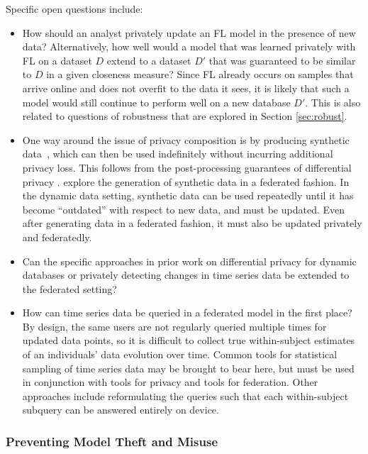 Specific open questions include:
\begin{itemize}
    \item How should an analyst privately update an FL model in the presence of new data? Alternatively, how well would a model that was learned privately with FL on a dataset $D$ extend to a dataset $D'$ that was guaranteed to be similar to $D$ in a given closeness measure?  Since FL already occurs on samples that arrive online and does not overfit to the data it sees, it is likely that such a model would still continue to perform well on a new database $D'$.  
    This is also related to questions of robustness that are explored in Section \ref{sec:robust}.
    \item One way around the issue of privacy composition is by producing synthetic data~\cite{dwork2014algorithmic,abay2018privacy}, which can then be used indefinitely without incurring additional privacy loss.  This follows from the post-processing guarantees of differential privacy \cite{DMNS06}.  \citet{augenstein2019generative} explore the generation of synthetic data in a federated fashion.  In the dynamic data setting, synthetic data can be used repeatedly until it has become ``outdated'' with respect to new data, and must be updated.  Even after generating data in a federated fashion, it must also be updated privately and federatedly.
    \item Can the specific approaches in prior work on differential privacy for dynamic databases \cite{CKLT18} or privately detecting changes in time series data \cite{CKM+18, CKM+18b} be extended to the federated setting?
    \item How can time series data be queried in a federated model in the first place?  By design, the same users are not regularly queried multiple times for updated data points, so it is difficult to collect true within-subject estimates of an individuals' data evolution over time. Common tools for statistical sampling of time series data may be brought to bear here, but must be used in conjunction with tools for privacy and tools for federation.  Other approaches include reformulating the queries such that each within-subject subquery can be answered entirely on device.
\end{itemize}

\subsubsection{Preventing Model Theft and Misuse}
\label{sssec:model_theft}

